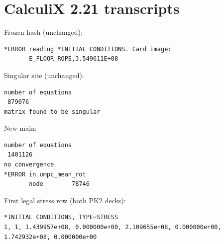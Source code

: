 \documentclass[11pt,a4paper]{article}
\begin{document}


\section{CalculiX 2.21 transcripts}
\label{app:ccx}
Frozen hash (unchanged):
\begin{lstlisting}
*ERROR reading *INITIAL CONDITIONS. Card image:
       E_FLOOR_ROPE,3.549611E+08
\end{lstlisting}
Singular site (unchanged):
\begin{lstlisting}
number of equations
 879076
matrix found to be singular
\end{lstlisting}
New main:
\begin{lstlisting}
number of equations
 1401126
no convergence
*ERROR in umpc_mean_rot
       node        78746
\end{lstlisting}
First legal stress row (both PK2 decks):
\begin{lstlisting}
*INITIAL CONDITIONS, TYPE=STRESS
1, 1, 1.439957e+08, 0.000000e+00, 2.109655e+08, 0.000000e+00, 1.742932e+08, 0.000000e+00
\end{lstlisting}
\end{document}
